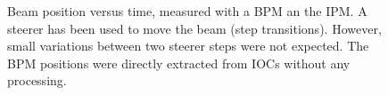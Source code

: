 \begin{figure}[!ht]
	\begin{center}
		
	\end{center}
  \caption[Beam position versus time, measured with a BPM and an IPM]
  {Beam position versus time, measured with a BPM an the IPM.
  A steerer has been used to move the beam (step transitions).
  However, small variations between two steerer steps were not expected. 
  The BPM positions were directly extracted from IOCs without any processing.}
	\label{chap4:BPMvsIPM}
\end{figure}
